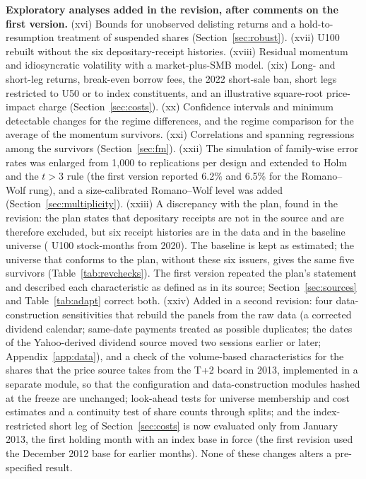 \documentclass[11pt]{article}
\newcommand{\RW}{Romano--Wolf}
\begin{document}
\textbf{Exploratory analyses added in the revision, after comments on the first version.} (xvi) Bounds for unobserved
delisting returns and a hold-to-resumption treatment of suspended shares (Section~\ref{sec:robust}). (xvii) U100 rebuilt
without the six depositary-receipt histories. (xviii) Residual momentum and idiosyncratic volatility with a
market-plus-SMB model. (xix) Long- and short-leg returns, break-even borrow fees, the 2022 short-sale ban, short legs
restricted to U50 or to index constituents, and an illustrative square-root price-impact charge
(Section~\ref{sec:costs}). (xx) Confidence intervals and minimum detectable changes for the regime differences, and the
regime comparison for the average of the momentum survivors. (xxi) Correlations and spanning regressions among the
survivors (Section~\ref{sec:fm}). (xxii) The simulation of family-wise error rates was enlarged from 1{,}000 to
 replications per design and extended to Holm and the $t>3$ rule (the first version reported 6.2\% and
6.5\% for the \RW{} rung), and a size-calibrated \RW{} level was added (Section~\ref{sec:multiplicity}). (xxiii) A discrepancy with the plan, found in the revision: the plan states that depositary receipts are not in the
source and are therefore excluded, but six receipt histories are in the data and in the baseline universe
( U100 stock-months from 2020). The baseline is kept as estimated; the universe that conforms to the
plan, without these six issuers, gives the same five survivors (Table~\ref{tab:revchecks}). The first version repeated
the plan's statement and described each characteristic as defined as in its source; Section~\ref{sec:sources} and
Table~\ref{tab:adapt} correct both. (xxiv) Added in a second revision: four data-construction sensitivities that
rebuild the panels from the raw data (a corrected dividend calendar; same-date payments treated as possible
duplicates; the dates of the Yahoo-derived dividend source moved two sessions earlier or later; Appendix~\ref{app:data}),
and a check of the volume-based characteristics for the shares that the price source takes from the T+2 board in 2013,
implemented in a separate module, so that the configuration and data-construction modules hashed at the freeze are
unchanged; look-ahead tests for universe membership and cost estimates and a continuity test of share counts through
splits; and the index-restricted short leg of Section~\ref{sec:costs} is now evaluated only from January 2013, the
first holding month with an index base in force (the first revision used the December 2012 base for earlier months).
None of these changes alters a pre-specified result.
\end{document}

